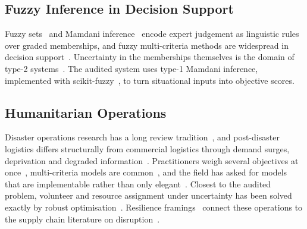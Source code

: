 \documentclass[systems,article,accept,moreauthors,pdftex]{Definitions/mdpi}
\begin{document}
\subsection{Fuzzy Inference in Decision Support}
Fuzzy sets~\cite{zadeh1965fuzzy} and Mamdani inference~\cite{mamdani1975linguistic} encode
expert judgement as linguistic rules over graded memberships, and fuzzy multi-criteria
methods are widespread in decision support~\cite{kahraman2015fuzzymcdm}. Uncertainty in
the memberships themselves is the domain of type-2 systems~\cite{mendel2017uncertain,castillo2008type2}.
The audited system uses type-1 Mamdani inference, implemented with
scikit-fuzzy~\cite{warner2019skfuzzy}, to turn situational inputs into objective scores.

\subsection{Humanitarian Operations}
Disaster operations research has a long review
tradition~\cite{altay2006ormsdisaster,galindo2013review,caunhye2012emergency}, and
post-disaster logistics differs structurally from commercial logistics through demand
surges, deprivation and degraded information~\cite{holguinveras2012unique,kovacs2007humanitarian,sheu2007emergency}.
Practitioners weigh several objectives at once~\cite{gralla2014tradeoffs}, multi-criteria
models are common~\cite{gutjahr2016multicriteria}, and the field has asked for models that
are implementable rather than only elegant~\cite{besiou2020humanitarian}. Closest to the
audited problem, volunteer and resource assignment under uncertainty has been solved
exactly by robust \mbox{optimisation~\cite{lassiter2015volunteer}}. Resilience
framings~\cite{bruneau2003resilience,christopher2004resilient,sheffi2005resilient,hosseini2019review}
connect these operations to the supply chain literature \linebreak  on
disruption~\cite{queiroz2022epidemic,aghsami2024humanitarian}.
\end{document}
